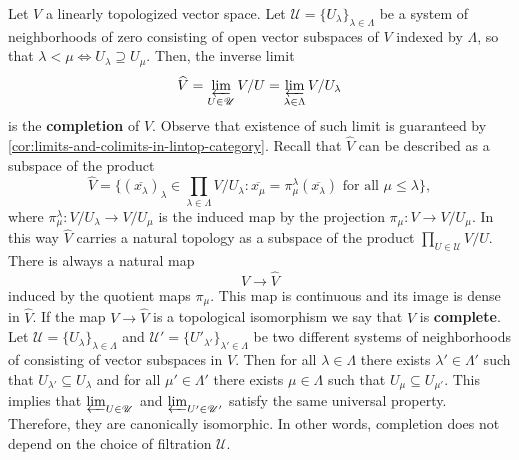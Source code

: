 \begin{definition}\label{def:completion}
	Let $V$ a linearly topologized vector space. Let $\mathscr{U} = \{U_{\lambda}\}_{\lambda\in \Lambda}$ be a system of neighborhoods of zero consisting of open vector subspaces of $V$ indexed by $\Lambda$, so that $\lambda < \mu \iff U_{\lambda} \supseteq U_{\mu}$. Then, the inverse limit
	\[
		\widehat{V} = \varprojlim_{U\in \mathscr{U}} V/U = \varprojlim_{\lambda\in \Lambda} V/U_{\lambda}
	\]
	is the \textbf{completion} of $V$. Observe that existence of such limit is guaranteed by \cref{cor:limits-and-colimits-in-lintop-category}. Recall that $\widehat{V}$ can be described as a subspace of the product 
	\[
		\widehat{V} = \{(\overline{x_{\lambda}})_{\lambda}\in \prod_{\lambda\in \Lambda} V/U_{\lambda}\colon  \overline{x_{\mu}} = \pi_{\mu}^{\lambda}(\overline{x_{\lambda}}) \text{ for all } \mu \leq \lambda \},
	\] 
	where $\pi_{\mu}^{\lambda}\colon V/U_{\lambda} \to V/U_{\mu}$ is the induced map by the projection $\pi_{\mu}\colon V \to V/U_{\mu}$. In this way $\widehat{V}$ carries a natural topology as a subspace of the product $\prod_{U\in \mathscr{U}} V/U$.  There is always a natural map
	\[
		V \to \widehat{V}
	\]
	induced by the quotient maps $\pi_{\mu}$. This map is continuous and its image is dense in $\widehat{V}$. If the map $V \to \widehat{V}$ is a topological isomorphism we say that $V$ is \textbf{complete}. Let $\mathscr{U} = \{U_{\lambda}\}_{\lambda\in \Lambda}$ and $\mathscr{U}' = \{U'_{\lambda'}\}_{\lambda' \in \Lambda}$ be two different systems of neighborhoods of consisting of vector subspaces in $V$. Then for all $\lambda \in \Lambda$ there exists $\lambda'\in \Lambda'$ such that $U_{\lambda'} \subseteq U_{\lambda}$ and for all $\mu'\in \Lambda'$ there exists $\mu\in \Lambda$ such that $U_{\mu}\subseteq U_{\mu'}$. This implies that $\varprojlim_{U\in \mathscr{U}}$ and $\varprojlim_{U'\in \mathscr{U}'}$ satisfy the same universal property. Therefore, they are canonically isomorphic. In other words, completion does not depend on the choice of filtration $\mathscr{U}$.
\end{definition}
